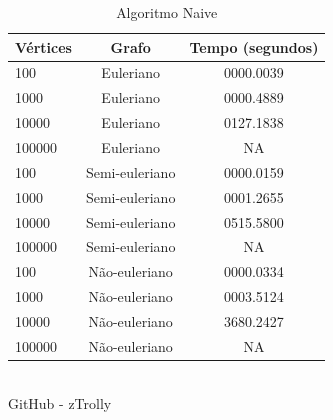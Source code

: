\begin{table}[htb]
	\centering
	\caption{\hspace{0.1cm} Algoritmo Naive}
	\vspace{-0.3cm} %
	\label{tab:tabela1}
	\begin{tabular}{l|c|c}
  \hline
    \textbf{Vértices}	& \textbf{Grafo} & \textbf{Tempo (segundos)} \\
    \hline
     100	 & Euleriano      &  0000.0039     \\
     1000	 & Euleriano      &  0000.4889     \\
     10000	 & Euleriano      &  0127.1838   \\
     100000  & Euleriano      &  NA         \\
     100	 & Semi-euleriano &  0000.0159     \\
     1000	 & Semi-euleriano &  0001.2655     \\
     10000	 & Semi-euleriano &  0515.5800   \\
     100000  & Semi-euleriano &  NA         \\
     100	 & Não-euleriano  &  0000.0334     \\
     1000	 & Não-euleriano  &  0003.5124     \\
     10000	 & Não-euleriano  &  3680.2427  \\
     100000  & Não-euleriano  &  NA         \\

     \hline
 \end{tabular}
 	\vspace{.1cm}  %
	\small
	{\footnotesize\\ GitHub - zTrolly}
\end{table}


